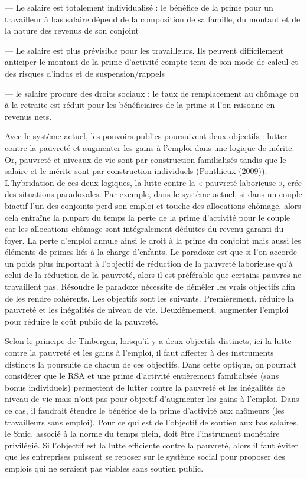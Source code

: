 \documentclass[
  french,
]{article}
\begin{document}
--- Le salaire est totalement individualisé : le bénéfice de la prime
pour un travailleur à bas salaire dépend de la composition de sa
famille, du montant et de la nature des revenus de son conjoint

--- Le salaire est plus prévisible pour les travailleurs. Ils peuvent
difficilement anticiper le montant de la prime d'activité compte tenu de
son mode de calcul et des risques d'indus et de suspension/rappels

--- le salaire procure des droits sociaux : le taux de remplacement au
chômage ou à la retraite est réduit pour les bénéficiaires de la prime
si l'on raisonne en revenus nets.

Avec le système actuel, les pouvoirs publics poursuivent deux objectifs
: lutter contre la pauvreté et augmenter les gains à l'emploi dans une
logique de mérite. Or, pauvreté et niveaux de vie sont par construction
familialisés tandis que le salaire et le mérite sont par construction
individuels (Ponthieux (2009)). L'hybridation de ces deux logiques, la
lutte contre la « pauvreté laborieuse », crée des situations
paradoxales. Par exemple, dans le système actuel, si dans un couple
biactif l'un des conjoints perd son emploi et touche des allocations
chômage, alors cela entraîne la plupart du temps la perte de la prime
d'activité pour le couple car les allocations chômage sont intégralement
déduites du revenu garanti du foyer. La perte d'emploi annule ainsi le
droit à la prime du conjoint mais aussi les éléments de primes liés à la
charge d'enfants. Le paradoxe est que si l'on accorde un poids plus
important à l'objectif de réduction de la pauvreté laborieuse qu'à celui
de la réduction de la pauvreté, alors il est préférable que certains
pauvres ne travaillent pas. Résoudre le paradoxe nécessite de démêler
les vrais objectifs afin de les rendre cohérents. Les objectifs sont les
suivants. Premièrement, réduire la pauvreté et les inégalités de niveau
de vie. Deuxièmement, augmenter l'emploi pour réduire le coût public de
la pauvreté.

Selon le principe de Tinbergen, lorsqu'il y a deux objectifs distincts,
ici la lutte contre la pauvreté et les gains à l'emploi, il faut
affecter à des instruments distincts la poursuite de chacun de ces
objectifs. Dans cette optique, on pourrait considérer que le RSA et une
prime d'activité entièrement familialisée (sans bonus individuels)
permettent de lutter contre la pauvreté et les inégalités de niveau de
vie mais n'ont pas pour objectif d'augmenter les gains à l'emploi. Dans
ce cas, il faudrait étendre le bénéfice de la prime d'activité aux
chômeurs (les travailleurs sans emploi). Pour ce qui est de l'objectif
de soutien aux bas salaires, le Smic, associé à la norme du temps plein,
doit être l'instrument monétaire privilégié. Si l'objectif est la lutte
efficiente contre la pauvreté, alors il faut éviter que les entreprises
puissent se reposer sur le système social pour proposer des emplois qui
ne seraient pas viables sans soutien public.
\end{document}
